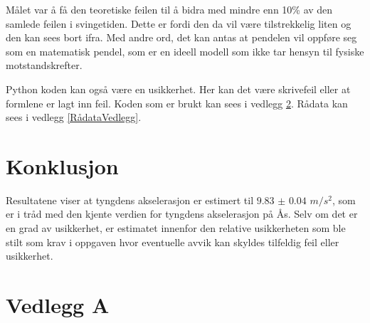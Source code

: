 \documentclass[twocolumn, 11pt]{article} %
\begin{document}
Målet var å få den teoretiske feilen til å bidra med mindre enn 10\% av den samlede feilen i svingetiden. Dette er fordi den da vil være tilstrekkelig liten og den kan sees bort ifra. Med andre ord, det kan antas at pendelen vil oppføre seg som en matematisk pendel, som er en ideell modell som ikke tar hensyn til fysiske motstandskrefter.


Python koden kan også være en usikkerhet. Her kan det være skrivefeil eller at formlene er lagt inn feil. Koden som er brukt kan sees i vedlegg \ref{Python}. Rådata kan sees i vedlegg \ref{RådataVedlegg}.

\section{Konklusjon}

Resultatene viser at tyngdens akselerasjon er estimert til $9.83$ $\pm$ $0.04$ $m/s^2$, som er i tråd med den kjente verdien for tyngdens akselerasjon på Ås. Selv om det er en grad av usikkerhet, er estimatet innenfor den relative usikkerheten som ble stilt som krav i oppgaven hvor eventuelle avvik kan skyldes tilfeldig feil eller usikkerhet.



\clearpage
\onecolumn
\newpage
\appendix
\section{Vedlegg A}
\label{Python}
\end{document}
